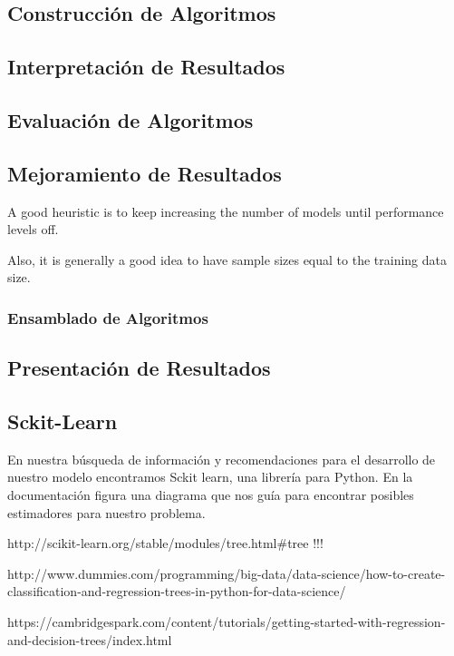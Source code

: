 \subsection{Construcción de Algoritmos}

\subsection{Interpretación de Resultados}

\subsection{Evaluación de Algoritmos}

\subsection{Mejoramiento de Resultados}

A good heuristic is to keep increasing the number of models until performance levels off.

Also, it is generally a good idea to have sample sizes equal to the training data size.


\subsubsection{Ensamblado de Algoritmos}

\subsection{Presentación de Resultados}

\subsection{Sckit-Learn}

En nuestra búsqueda de información y recomendaciones para el desarrollo de nuestro modelo encontramos Sckit learn, una librería para Python. 
En la documentación figura una diagrama que nos guía para encontrar posibles estimadores para nuestro problema.

http://scikit-learn.org/stable/modules/tree.html#tree !!!

http://www.dummies.com/programming/big-data/data-science/how-to-create-classification-and-regression-trees-in-python-for-data-science/

https://cambridgespark.com/content/tutorials/getting-started-with-regression-and-decision-trees/index.html

